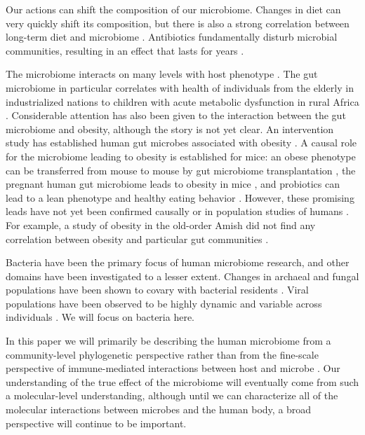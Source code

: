 \documentclass{amsart}
\begin{document}
Our actions can shift the composition of our microbiome.
Changes in diet can very quickly shift its composition, but there is also a strong correlation between long-term diet and microbiome \citep{li2009human,wu2011linking}.
Antibiotics fundamentally disturb microbial communities, resulting in an effect that lasts for years \citep{jernberg2007long,dethlefsen2008pervasive,jakobsson2010short,dethlefsen2011incomplete}.

The microbiome interacts on many levels with host phenotype \citep[reviewed in][]{cho2012human}.
The gut microbiome in particular correlates with health of individuals from the elderly in industrialized nations \citep{claesson2012gut} to children with acute metabolic dysfunction in rural Africa \citep{smith2013gut}.
Considerable attention has also been given to the interaction between the gut microbiome and obesity, although the story is not yet clear.
An intervention study has established human gut microbes associated with obesity \citep{ley2006microbial}.
A causal role for the microbiome leading to obesity is established for mice: an obese phenotype can be transferred from mouse to mouse by gut microbiome transplantation \citep{turnbaugh2006obesity}, the pregnant human gut microbiome leads to obesity in mice \citep{koren2012host}, and probiotics can lead to a lean phenotype and healthy eating behavior \citep{poutahidis2013microbial}.
However, these promising leads have not yet been confirmed causally or in population studies of humans \citep{zhao2013gut}.
For example, a study of obesity in the old-order Amish did not find any correlation between obesity and particular gut communities \citep{zupancic2012analysis}.

Bacteria have been the primary focus of human microbiome research, and other domains have been investigated to a lesser extent.
Changes in archaeal and fungal populations have been shown to covary with bacterial residents \citep{hoffmann2013archaea}.
Viral populations have been observed to be highly dynamic and variable across individuals \citep{reyes2010viruses,minot2011human,minot2013rapid}.
We will focus on bacteria here.

In this paper we will primarily be describing the human microbiome from a community-level phylogenetic perspective rather than from the fine-scale perspective of immune-mediated interactions between host and microbe \citep[reviewed in][]{hooper2012interactions}.
Our understanding of the true effect of the microbiome will eventually come from such a molecular-level understanding, although until we can characterize all of the molecular interactions between microbes and the human body, a broad perspective will continue to be important.
\end{document}
